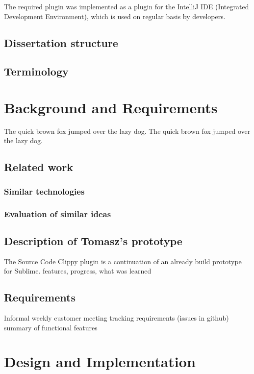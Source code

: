 \documentclass{l4proj}
\begin{document}
The required plugin was implemented as a plugin for the IntelliJ IDE (Integrated Development Environment), which is used on regular basis by developers.

\section{Dissertation structure}

\section{Terminology}

\chapter{Background and Requirements}
The quick brown fox jumped over the lazy dog.
The quick brown fox jumped over the lazy dog.

\section{Related work}

\subsection{Similar technologies}

\subsection{Evaluation of similar ideas}

\section{Description of Tomasz's prototype}
The Source Code Clippy plugin is a continuation of an already build prototype for Sublime.
features, progress, what was learned

\section{Requirements}
Informal weekly customer meeting
tracking requirements (issues in github)
summary of functional features

\chapter{Design and Implementation}
\end{document}
